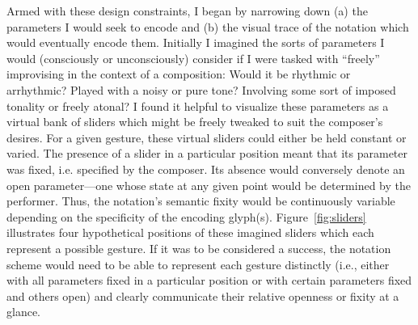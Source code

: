     Armed with these design constraints, I began by narrowing down (a) the parameters I would seek to encode and (b) the visual trace of the notation which would eventually encode them. Initially I imagined the sorts of parameters I would (consciously or unconsciously) consider if I were tasked with ``freely'' improvising in the context of a composition: Would it be rhythmic or arrhythmic? Played with a noisy or pure tone? Involving some sort of imposed tonality or freely atonal? I found it helpful to visualize these parameters as a virtual bank of sliders which might be freely tweaked to suit the composer's desires. For a given gesture, these virtual sliders could either be held constant or varied. The presence of a slider in a particular position meant that its parameter was fixed, i.e. specified by the composer. Its absence would conversely denote an open parameter---one whose state at any given point would be determined by the performer. Thus, the notation's semantic fixity would be continuously variable depending on the specificity of the encoding glyph(s). Figure~\ref{fig:sliders} illustrates four hypothetical positions of these imagined sliders which each represent a possible gesture. If it was to be considered a success, the notation scheme would need to be able to represent each gesture distinctly (i.e., either with all parameters fixed in a particular position or with certain parameters fixed and others open) and clearly communicate their relative openness or fixity at a glance.
    

